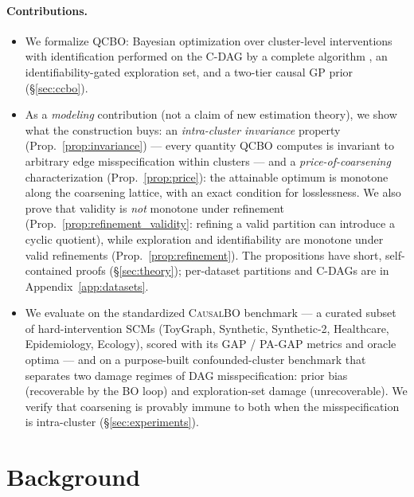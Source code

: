 \documentclass{article}
\newcommand{\QCBO}{\textsc{QCBO}}
\begin{document}
\paragraph{Contributions.}
\begin{itemize}[leftmargin=1.2em,itemsep=1pt,topsep=2pt]
  \item We formalize \QCBO{}: Bayesian optimization over cluster-level
  interventions with identification performed on the C-DAG by a complete
  algorithm \citep{shpitser2006identification}, an
  identifiability-gated exploration set, and a two-tier causal GP prior
  (\S\ref{sec:ccbo}).
  \item As a \emph{modeling} contribution (not a claim of new estimation
  theory), we show what the construction buys: an \emph{intra-cluster
  invariance} property (Prop.~\ref{prop:invariance}) --- every quantity
  \QCBO{} computes is invariant to arbitrary edge misspecification within
  clusters --- and a \emph{price-of-coarsening} characterization
  (Prop.~\ref{prop:price}): the attainable optimum is monotone along the
  coarsening lattice, with an exact condition for losslessness. We also prove
  that validity is \emph{not} monotone under refinement
  (Prop.~\ref{prop:refinement_validity}: refining a valid partition can
  introduce a cyclic quotient), while exploration and identifiability are
  monotone under valid refinements (Prop.~\ref{prop:refinement}). The
  propositions have short, self-contained proofs (\S\ref{sec:theory}); per-dataset
  partitions and C-DAGs are in Appendix~\ref{app:datasets}.
  \item We evaluate on the standardized \textsc{CausalBO} benchmark
  \citep{anonymous2026cbobench} --- a curated subset of hard-intervention SCMs
  (ToyGraph, Synthetic, Synthetic-2, Healthcare, Epidemiology, Ecology),
  scored with its GAP / PA-GAP metrics and oracle optima --- and on a
  purpose-built confounded-cluster benchmark that separates two damage regimes
  of DAG misspecification: prior bias (recoverable by the BO loop) and
  exploration-set damage (unrecoverable). We verify that coarsening is
  provably immune to both when the misspecification is intra-cluster
  (\S\ref{sec:experiments}).
\end{itemize}


\section{Background}
\label{sec:background}
\end{document}
